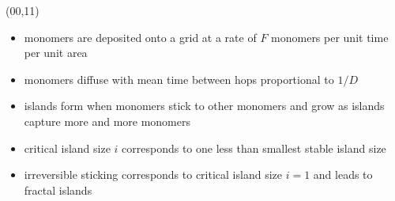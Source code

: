 \documentclass{article}
\def\CHead#1{\begin{center}\noindent{\LARGE\color{darkblue} #1}\end{center}}
\renewcommand{\LARGE}{\fontsize{43}{54}\selectfont}
\begin{document}
\begin{textblock}{15}(00,11)
\CHead{The Model}
\begin{itemize}
\item monomers are deposited onto a grid at a rate of $F$ monomers per unit
time per unit area
\item monomers diffuse with mean time between hops proportional to $1/D$
\item islands form when monomers stick to other monomers and grow as islands
capture more and more monomers
\item critical island size $i$ corresponds to one less than smallest stable
island size
\item irreversible sticking corresponds to critical island size $i = 1$ and
leads to fractal islands
\end{itemize}



\end{textblock}
\end{document}
